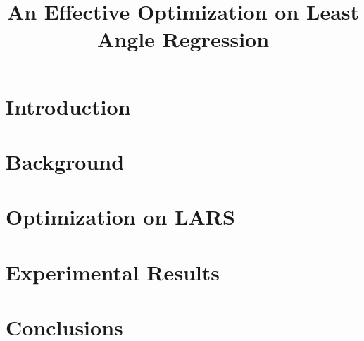 \documentclass[letterpaper]{article}
\title{An Effective Optimization on Least Angle Regression}
\begin{document}
%
\maketitle
%


\begin{abstract}

\end{abstract}

\section{Introduction}
\label{sec:introduction}


\section{Background}
\label{sec:background}


\section{Optimization on LARS}
\label{sec:method}


\section{Experimental Results}
\label{sec:experiment}


\section{Conclusions}
\label{sec:conclusions}




\end{document}
